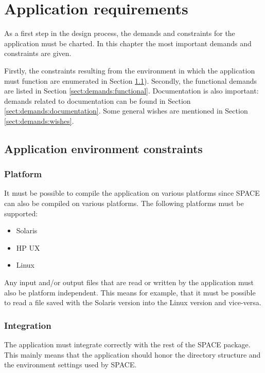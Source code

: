 
\chapter{Application requirements}
\label{chap:demands}

As a first step in the design process, the demands and constraints for the
application must be charted. In this chapter the most important demands and
constraints are given.

Firstly, the constraints resulting from the environment in which the
application must function are enumerated in Section
\ref{sect:demands:environment}). Secondly, the functional demands are listed in
Section \ref{sect:demands:functional}. Documentation is also important: demands
related to documentation can be found in Section
\ref{sect:demands:documentation}. Some general wishes are mentioned in Section
\ref{sect:demands:wishes}.

\section{Application environment constraints}
\label{sect:demands:environment}
\subsection{Platform}
It must be possible to compile the application on various platforms since SPACE
can also be compiled on various platforms. The following platforms must be
supported:
\begin{itemize}
\item Solaris
\item HP UX
\item Linux
\end{itemize}
Any input and/or output files that are read or written by the application must
also be platform independent. This means for example, that it must be possible
to read a file saved with the Solaris version into the Linux version and
vice-versa.

\subsection{Integration}
The application must integrate correctly with the rest of the SPACE package.
This mainly means that the application should honor the directory structure and
the environment settings used by SPACE.

